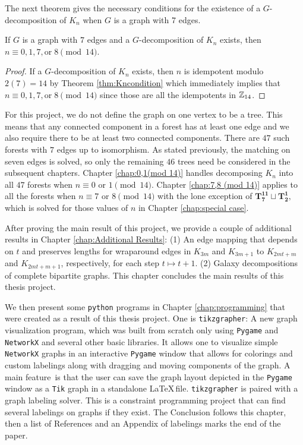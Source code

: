 The next theorem gives the necessary conditions for the existence of a $G$-decomposition of $K_n$ when $G$ is a graph with 7 edges.

\begin{thm}\label{thm:forestcondition}

  If $G$ is a graph with $7$ edges and a $G$-decomposition of $K_n$ exists, then $n \equiv 0,1,7, \textrm{or} \; 8 \pmod{14}$.

\end{thm}
\begin{proof}
    If a $G$-decomposition of $K_{n}$ exists, then $n$ is idempotent modulo $2(7)=14$ by Theorem \ref{thm:Kncondition} which immediately implies that $n \equiv 0,1,7, \textrm{or} \; 8 \pmod{14}$ since those are all the idempotents in $\mathbb{Z}_{14}$.
\end{proof}

For this project, we do not define the graph on one vertex to be a tree. This means that any connected component in a forest has at least one edge and we also require there to be at least two connected components. There are $47$ such forests with $7$ edges up to isomorphism.  As stated previously, the matching on seven edges is solved, so only the remaining $46$ trees need be considered in the subsequent chapters. Chapter \ref{chap:0,1(mod 14)} handles decomposing $K_{n}$ into all $47$ forests when $n \equiv 0 \textrm{ or } 1 \pmod{14}$. Chapter \ref{chap:7,8 (mod 14)} applies to all the forests when $n \equiv 7 \textrm{ or } 8 \pmod{14}$ with the lone exception of $\mathbf{T_{7}^{11}}\sqcup\mathbf{T_{2}^{1}},$ which is solved for those values of $n$ in Chapter \ref{chap:special case}.

After proving the main result of this project, we provide a couple of additional results in Chapter \ref{chap:Additional Results}: (1) An edge mapping that depends on $t$ and preserves lengths for wraparound edges in $K_{3m}$ and $K_{3m+1}$ to $K_{2mt+m}$ and $K_{2mt+m+1}$, respectively, for each step $t\mapsto t+1$. (2) Galaxy decompositions of complete bipartite graphs. This chapter concludes the main results of this thesis project.

We then present some \verb|python| programs in Chapter \ref{chap:programming} that were created as a result of this thesis project. One is \verb|tikzgrapher|: A new graph visualization program, which was built from scratch only using \verb|Pygame| and \verb|NetworkX| and several other basic libraries. It allows one to visualize simple \verb|NetworkX| graphs in an interactive \verb|Pygame| window that allows for colorings and custom labelings along with dragging and moving components of the graph. A main feature\ is that the user can save the graph layout depicted in the \verb|Pygame| window as a \verb|Tik| graph in a standalone \LaTeX$\,$file. \verb|tikzgrapher| is paired with a graph labeling solver. This is a constraint programming project that can find several labelings on graphs if they exist. The Conclusion follows this chapter, then a list of References and an Appendix of labelings marks the end of the paper.




